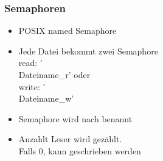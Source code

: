 \documentclass{beamer}
\begin{document}
\begin{frame}
  \frametitle{Semaphoren}
  \begin{itemize}
	\item POSIX named Semaphore
	\item Jede Datei bekommt zwei Semaphore\\
	  read: '\\Dateiname_r' oder\\
	  write: '\\Dateiname_w'
	\item Semaphore wird nach  benannt 
	\item Anzahlt Leser wird gezählt.\\
	  Falls 0, kann geschrieben werden
  \end{itemize}

\end{frame}
\end{document}
